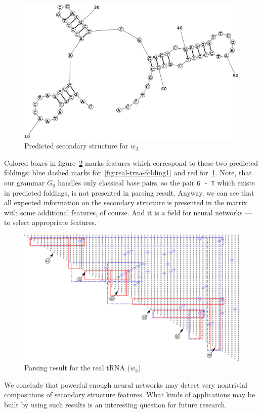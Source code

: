 \documentclass[a4paper,twoside]{article}
\begin{document}
\begin{figure}
\centering
\includegraphics[width=.45\textwidth]{figures/Fold2.pdf}
\caption{Predicted secondary structure for $w_3$}
\label{fig:real-trna-folding2}
\end{figure}

Colored boxes in figure~\ref{fig:real-trna} marks features which correspond to these two predicted foldings: blue dashed marks for~\ref{fig:real-trna-folding1} and red for~\ref{fig:real-trna-folding2}.
Note, that our grammar $G_0$ handles only classical base pairs, so the pair \verb|G - T| which exists in predicted foldings, is not presented in parsing result.
Anyway, we can see that all expected information on the secondary structure is presented in the matrix with some additional features, of course.
And it is a field for neural networks --- to select appropriate features.

\begin{figure}
\centering
\includegraphics[width=.98\textwidth]{figures/0m.pdf}
\caption{Parsing result for the real tRNA ($w_3$)}
\label{fig:real-trna}
\end{figure}

We conclude that powerful enough neural networks may detect very nontrivial compositions of secondary structure features. 
What kinds of applications may be built by using such results is an interesting question for future research.
\end{document}
